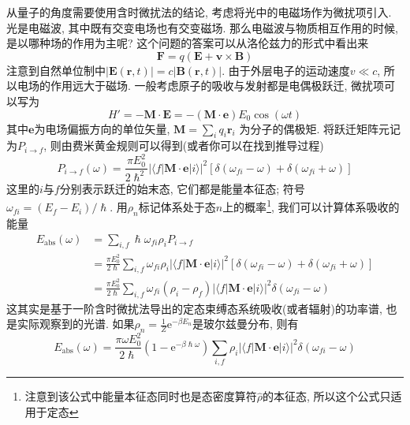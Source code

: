     从量子的角度需要使用含时微扰法的结论, 考虑将光中的电磁场作为微扰项引入. 光是电磁波, 其中既有交变电场也有交变磁场. 那么电磁波与物质相互作用的时候, 是以哪种场的作用为主呢? 这个问题的答案可以从洛伦兹力的形式中看出来
    \begin{equation}
        \bm{F} = q (\bm{E} + \bm{v} \times \bm{B})
    \end{equation}
    注意到自然单位制中$|\bm{E}(\bm r,t)| = c|\bm{B}(\bm r,t)|$. 由于外层电子的运动速度$v \ll c$, 所以电场的作用远大于磁场. 一般考虑原子的吸收与发射都是电偶极跃迁, 微扰项可以写为
    \begin{equation}
        H' = - \bm{M} \cdot \bm{E} = - (\bm{M} \cdot \bm{e}) E_0 \cos(\omega t)
    \end{equation}
    其中$\bm{e}$为电场偏振方向的单位矢量, $\bm{M} = \sum_i q_i \bm{r}_i$ 为分子的偶极矩. 将跃迁矩阵元记为$P_{i\to f}$, 则由费米黄金规则可以得到(或者你可以在\cite{蒋鸿中物化:含时微扰}找到推导过程)
    \begin{equation}
        P_{i\to f}(\omega) = \frac{\pi E_0^2}{2\hslash^2} \left| \langle f|\bm{M} \cdot \bm{e}|i \rangle \right|^2 \left[ \delta(\omega_{fi} - \omega) + \delta(\omega_{fi} + \omega) \right]
    \end{equation}
    这里的$i$与$f$分别表示跃迁的始末态, 它们都是能量本征态; 符号$\omega_{fi} = (E_f - E_i)/\hslash$. 用$\rho_n$标记体系处于态$n$上的概率\footnote{注意到该公式中能量本征态同时也是态密度算符$\hat\rho$的本征态, 所以这个公式只适用于定态}, 我们可以计算体系吸收的能量
    \begin{equation}\begin{aligned}
        E_\mathrm{abs}(\omega) 
        &= \sum_{i,f}  \hslash\omega_{fi} \rho_i P_{i\to f} \\
        &= \frac{\pi E_0^2}{2\hslash} \sum_{i,f} \omega_{fi} \rho_i \left| \langle f|\bm{M} \cdot \bm{e}|i \rangle \right|^2 \left[ \delta(\omega_{fi} - \omega) + \delta(\omega_{fi} + \omega) \right] \\
        &= \frac{\pi E_0^2}{2\hslash} \sum_{i,f} \omega_{fi} (\rho_i - \rho_f) \left| \langle f|\bm{M} \cdot \bm{e}|i \rangle \right|^2 \delta(\omega_{fi} - \omega)
    \end{aligned}\end{equation}
    这其实是基于一阶含时微扰法导出的定态束缚态系统吸收(或者辐射)的功率谱, 也是实际观察到的光谱. 如果$\rho_n = \frac 1Z \mathrm{e}^{-\beta E_n}$是玻尔兹曼分布, 则有
    \begin{equation}
        E_\mathrm{abs}(\omega) = \frac{\pi \omega E_0^2}{2\hslash} (1 - \mathrm{e}^{-\beta\hslash\omega}) \sum_{i,f} \rho_i \left| \langle f|\bm{M} \cdot \bm{e}|i \rangle \right|^2 \delta(\omega_{fi} - \omega)
    \end{equation}

